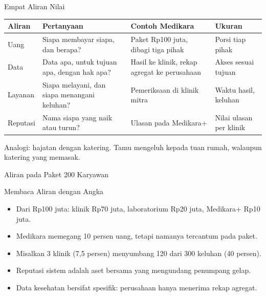 \documentclass[aspectratio=169, table, 12pt]{beamer}
\begin{document}
\begin{frame}{{\Large Empat Aliran Nilai}}
  \footnotesize
  \begin{tabularx}{\textwidth}{>{\raggedright\arraybackslash}p{1.7cm}
      >{\raggedright\arraybackslash}X >{\raggedright\arraybackslash}X
      >{\raggedright\arraybackslash}p{3.0cm}}
    \hline
    \textbf{Aliran} & \textbf{Pertanyaan} & \textbf{Contoh Medikara} & \textbf{Ukuran} \\ \hline
    Uang & Siapa membayar siapa, dan berapa? & Paket Rp100 juta, dibagi tiga pihak & Porsi tiap pihak \\ \hline
    Data & Data apa, untuk tujuan apa, dengan hak apa? & Hasil ke klinik, rekap agregat ke perusahaan & Akses sesuai tujuan \\ \hline
    Layanan & Siapa melayani, dan siapa menangani keluhan? & Pemeriksaan di klinik mitra & Waktu hasil, keluhan \\ \hline
    Reputasi & Nama siapa yang naik atau turun? & Ulasan pada Medikara+ & Nilai ulasan per klinik \\ \hline
  \end{tabularx}

  \vspace{8pt}
  \small Analogi: hajatan dengan katering. Tamu mengeluh kepada tuan rumah, walaupun katering yang memasak.
\end{frame}

\begin{frame}{{\Large Aliran pada Paket 200 Karyawan}}
  \centering
\end{frame}

\begin{frame}{{\Large Membaca Aliran dengan Angka}}
  \vspace{10pt}
  \begin{itemize}
    \item Dari Rp100 juta: klinik Rp70 juta, laboratorium Rp20 juta, Medikara+ Rp10 juta.
    \item Medikara memegang 10 persen uang, tetapi namanya tercantum pada paket.
    \item Misalkan 3 klinik (7,5 persen) menyumbang 120 dari 300 keluhan (40 persen).
    \item Reputasi sistem adalah aset bersama yang mengundang penumpang gelap.
    \item Data kesehatan bersifat spesifik: perusahaan hanya menerima rekap agregat.
  \end{itemize}
\end{frame}
\end{document}
